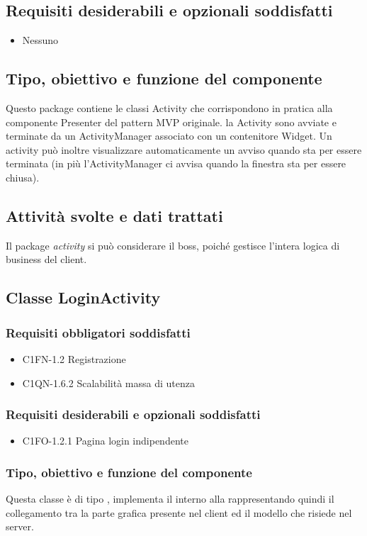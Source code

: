 \subsection*{Requisiti desiderabili e opzionali soddisfatti}
\begin{itemize}
    \item Nessuno
\end{itemize}
\subsection*{Tipo, obiettivo e funzione del componente}
Questo package contiene le classi Activity che corrispondono in pratica alla
componente Presenter del pattern MVP originale. la Activity sono avviate e
terminate da un ActivityManager associato con un contenitore Widget. Un activity
pu\`o inoltre visualizzare automaticamente un avviso quando sta per essere
terminata (in pi\`u l'ActivityManager ci avvisa quando la finestra sta per
essere chiusa).
\subsection*{Attivit\`a svolte e dati trattati} Il package \emph{activity} si
pu\`o considerare il boss, poich\'e gestisce l'intera logica di business del
client.

\subsection{Classe LoginActivity}
\subsubsection*{Requisiti obbligatori soddisfatti}
\begin{itemize}
	\item C1FN-1.2 Registrazione
	\item C1QN-1.6.2 Scalabilit\`a massa di utenza
\end{itemize}
\subsubsection*{Requisiti desiderabili e opzionali soddisfatti}
\begin{itemize}
    \item C1FO-1.2.1 Pagina login indipendente
\end{itemize}
\subsubsection*{Tipo, obiettivo e funzione del componente}
Questa classe \`e di tipo , implementa il 
interno alla  rappresentando quindi il collegamento tra la parte
grafica presente nel client ed il modello che risiede nel server.
